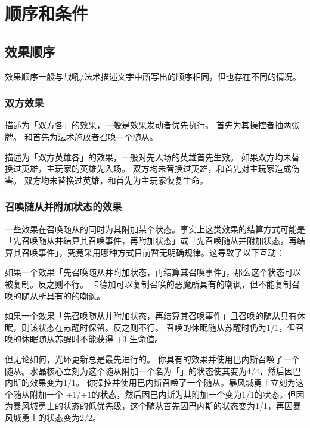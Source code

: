 \chapter{顺序和条件}

\section{效果顺序}

效果顺序一般与战吼/法术描述文字中所写出的顺序相同，但也存在不同的情况。

\subsection{双方效果}

描述为「双方各」的效果，一般是效果发动者优先执行。
\example {}首先为其操控者抽两张牌。
\example {}和首先为法术施放者召唤一个随从。

描述为「双方英雄各」的效果，一般对先入场的英雄首先生效。
\notice 如果双方均未替换过英雄，主玩家的英雄先入场。
\example 双方均未替换过英雄，和首先对主玩家造成伤害。
\example 双方均未替换过英雄，和首先为主玩家恢复生命。

\subsection{召唤随从并附加状态的效果}

一些效果在召唤随从的同时为其附加某个状态。事实上这类效果的结算方式可能是「先召唤随从并结算其召唤事件，再附加状态」或「先召唤随从并附加状态，再结算其召唤事件」，究竟采用哪种方式目前暂无明确规律。这导致了以下互动：

如果一个效果「先召唤随从并附加状态，再结算其召唤事件」，那么这个状态可以被复制。反之则不行。
\example 卡德加可以复制召唤的恶魔所具有的嘲讽，但不能复制召唤的随从所具有的的嘲讽。

如果一个效果「先召唤随从并附加状态，再结算其召唤事件」且召唤的随从具有休眠，则该状态在苏醒时保留。反之则不行。
\example {}召唤的休眠随从苏醒时仍为1/1，但召唤的休眠随从苏醒时不能获得 +3 生命值。

但无论如何，光环更新总是最先进行的。
\example 你具有的效果并使用巴内斯召唤了一个随从。水晶核心立刻为这个随从附加一个名为「」的状态使其变为4/4，然后因巴内斯的效果变为1/1。
\example 你操控并使用巴内斯召唤了一个随从。暴风城勇士立刻为这个随从附加一个 +1/+1的状态，然后因巴内斯为其附加一个变为1/1的状态。但因为暴风城勇士的状态的低优先级，这个随从首先因巴内斯的状态变为1/1，再因暴风城勇士的状态变为2/2。

